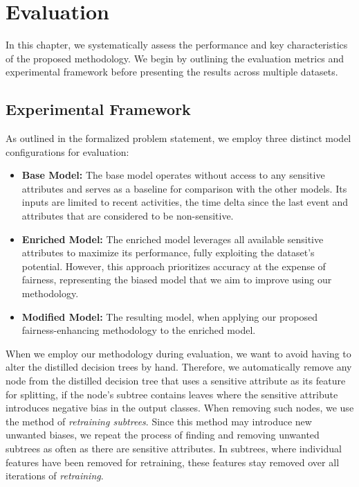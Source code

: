 %
\chapter{Evaluation}
\label{sec:evaluation}
In this chapter, we systematically assess the performance and key characteristics of the proposed methodology.
We begin by outlining the evaluation metrics and experimental framework before presenting the results across multiple datasets.

\section{Experimental Framework}
\label{sec:evaluation_framework}
As outlined in the formalized problem statement, we employ three distinct model configurations for evaluation:
\begin{itemize}
    \item \textbf{Base Model:}
        The base model operates without access to any sensitive attributes and serves as a baseline for comparison with the other models.
        Its inputs are limited to recent activities, the time delta since the last event
        and attributes that are considered to be non-sensitive.
    \item \textbf{Enriched Model:}
        The enriched model leverages all available sensitive attributes to maximize its performance,
        fully exploiting the dataset's potential.
        However, this approach prioritizes accuracy at the expense of fairness,
        representing the biased model that we aim to improve using our methodology.
    \item \textbf{Modified Model:}
        The resulting model, when applying our proposed fairness-enhancing methodology to the enriched model.
\end{itemize}

When we employ our methodology during evaluation, we want to avoid having to alter the distilled decision trees by hand.
Therefore, we automatically remove any node from the distilled decision tree that uses a sensitive attribute as its feature for splitting,
if the node's subtree contains leaves where the sensitive attribute introduces negative bias in the output classes.
When removing such nodes, we use the method of \textit{retraining subtrees}.
Since this method may introduce new unwanted biases, we repeat the process of finding and removing unwanted subtrees as often as there are sensitive attributes.
In subtrees, where individual features have been removed for retraining, these features stay removed over all iterations of \textit{retraining}.

